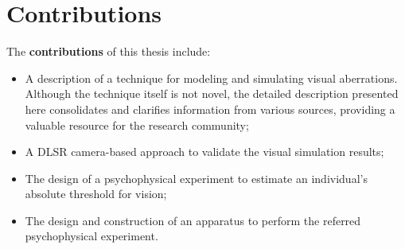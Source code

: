 
\section{Contributions}
\label{sec:Contributions}

The \textbf{contributions} of this thesis include:

\begin{itemize}

	\item A description of a technique for modeling and simulating visual aberrations. Although the technique itself is not novel, the detailed description presented here consolidates and clarifies information from various sources, providing a valuable resource for the research community;
	\item A DLSR camera-based approach to validate the visual simulation results;
	\item The design of a psychophysical experiment to estimate an individual's absolute threshold for vision;
	\item The design and construction of an apparatus to perform the referred psychophysical experiment.
	
\end{itemize}

